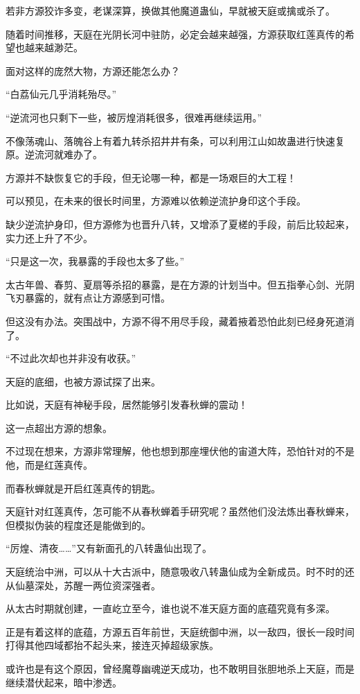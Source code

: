 \begin{this_body}
若非方源狡诈多变，老谋深算，换做其他魔道蛊仙，早就被天庭或擒或杀了。

随着时间推移，天庭在光阴长河中驻防，必定会越来越强，方源获取红莲真传的希望也越来越渺茫。

面对这样的庞然大物，方源还能怎么办？

“白荔仙元几乎消耗殆尽。”

“逆流河也只剩下一些，被厉煌消耗很多，很难再继续运用。”

不像荡魂山、落魄谷上有着九转杀招井井有条，可以利用江山如故蛊进行快速复原。逆流河就难办了。

方源并不缺恢复它的手段，但无论哪一种，都是一场艰巨的大工程！

可以预见，在未来的很长时间里，方源难以依赖逆流护身印这个手段。

缺少逆流护身印，但方源修为也晋升八转，又增添了夏槎的手段，前后比较起来，实力还上升了不少。

“只是这一次，我暴露的手段也太多了些。”

太古年兽、春剪、夏扇等杀招的暴露，是在方源的计划当中。但五指拳心剑、光阴飞刃暴露的，就有点让方源感到可惜。

但这没有办法。突围战中，方源不得不用尽手段，藏着掖着恐怕此刻已经身死道消了。

“不过此次却也并非没有收获。”

天庭的底细，也被方源试探了出来。

比如说，天庭有神秘手段，居然能够引发春秋蝉的震动！

这一点超出方源的想象。

不过现在想来，方源非常理解，他也想到那座埋伏他的宙道大阵，恐怕针对的不是他，而是红莲真传。

而春秋蝉就是开启红莲真传的钥匙。

天庭针对红莲真传，怎可能不从春秋蝉着手研究呢？虽然他们没法炼出春秋蝉来，但模拟伪装的程度还是能做到的。

“厉煌、清夜……”又有新面孔的八转蛊仙出现了。

天庭统治中洲，可以从十大古派中，随意吸收八转蛊仙成为全新成员。时不时的还从仙墓深处，苏醒一两位资深强者。

从太古时期就创建，一直屹立至今，谁也说不准天庭方面的底蕴究竟有多深。

正是有着这样的底蕴，方源五百年前世，天庭统御中洲，以一敌四，很长一段时间打得其他四域都抬不起头来，接连灭掉超级家族。

或许也是有这个原因，曾经魔尊幽魂逆天成功，也不敢明目张胆地杀上天庭，而是继续潜伏起来，暗中渗透。


\end{this_body}
